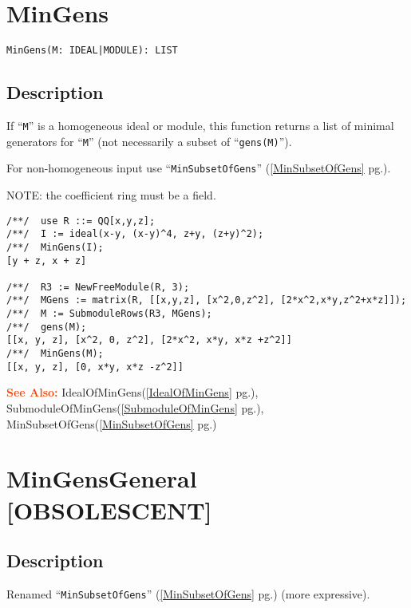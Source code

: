 \documentclass[a4paper]{mybook}
\newenvironment{command}{}{} %
\newcommand\SeeAlso{\par\textcolor{OrangeRed}{\textbf{\large See Also: }}}
\begin{document}
\section{MinGens}
\label{MinGens}
\begin{command} %


\begin{Verbatim}[label=syntax, rulecolor=\color{MidnightBlue},
frame=single]
MinGens(M: IDEAL|MODULE): LIST
\end{Verbatim}


\subsection*{Description}

If ``\verb&M&'' is a homogeneous ideal or module, this function returns
a list of minimal generators for ``\verb&M&'' (not necessarily a subset
of ``\verb&gens(M)&'').
\par 
For non-homogeneous input use ``\verb&MinSubsetOfGens&'' (\ref{MinSubsetOfGens} pg.\pageref{MinSubsetOfGens}).
\par 
NOTE: the coefficient ring must be a field.
\begin{Verbatim}[label=example, rulecolor=\color{PineGreen}, frame=single]
/**/  use R ::= QQ[x,y,z];
/**/  I := ideal(x-y, (x-y)^4, z+y, (z+y)^2);
/**/  MinGens(I);
[y + z, x + z]

/**/  R3 := NewFreeModule(R, 3);
/**/  MGens := matrix(R, [[x,y,z], [x^2,0,z^2], [2*x^2,x*y,z^2+x*z]]);
/**/  M := SubmoduleRows(R3, MGens);
/**/  gens(M);
[[x, y, z], [x^2, 0, z^2], [2*x^2, x*y, x*z +z^2]]
/**/  MinGens(M);
[[x, y, z], [0, x*y, x*z -z^2]]
\end{Verbatim}


\SeeAlso %
  IdealOfMinGens(\ref{IdealOfMinGens} pg.\pageref{IdealOfMinGens}), 
    SubmoduleOfMinGens(\ref{SubmoduleOfMinGens} pg.\pageref{SubmoduleOfMinGens}), 
    MinSubsetOfGens(\ref{MinSubsetOfGens} pg.\pageref{MinSubsetOfGens})
\end{command} %

\section{MinGensGeneral [OBSOLESCENT]}
\label{MinGensGeneral [OBSOLESCENT]}
\begin{command} %



\subsection*{Description}

Renamed ``\verb&MinSubsetOfGens&'' (\ref{MinSubsetOfGens} pg.\pageref{MinSubsetOfGens}) (more expressive).

\end{command} %
\end{document}

